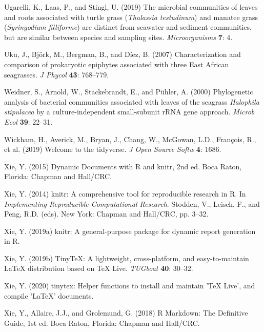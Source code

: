\documentclass[12pt,]{article}
\begin{document}
\leavevmode\hypertarget{ref-Ugarelli2019}{}%
Ugarelli, K., Laas, P., and Stingl, U. (2019) The microbial communities
of leaves and roots associated with turtle grass (\emph{Thalassia
testudinum}) and manatee grass (\emph{Syringodium filliforme}) are
distinct from seawater and sediment communities, but are similar between
species and sampling sites. \emph{Microorganisms} \textbf{7}: 4.

\leavevmode\hypertarget{ref-Uku2007}{}%
Uku, J., Björk, M., Bergman, B., and Díez, B. (2007) Characterization
and comparison of prokaryotic epiphytes associated with three East
African seagrasses. \emph{J Phycol} \textbf{43}: 768--779.

\leavevmode\hypertarget{ref-Weidner2000}{}%
Weidner, S., Arnold, W., Stackebrandt, E., and Pühler, A. (2000)
Phylogenetic analysis of bacterial communities associated with leaves of
the seagrass \emph{Halophila stipulacea} by a culture-independent
small-subunit rRNA gene approach. \emph{Microb Ecol} \textbf{39}:
22--31.

\leavevmode\hypertarget{ref-Wickham2019}{}%
Wickham, H., Averick, M., Bryan, J., Chang, W., McGowan, L.D., François,
R., et al. (2019) Welcome to the tidyverse. \emph{J Open Source Softw}
\textbf{4}: 1686.

\leavevmode\hypertarget{ref-Xie2015}{}%
Xie, Y. (2015) Dynamic Documents with R and knitr, 2nd ed. Boca Raton,
Florida: Chapman and Hall/CRC.

\leavevmode\hypertarget{ref-Xie2014}{}%
Xie, Y. (2014) knitr: A comprehensive tool for reproducible research in
R. In \emph{Implementing Reproducible Computational Research}. Stodden,
V., Leisch, F., and Peng, R.D. (eds). New York: Chapman and Hall/CRC,
pp. 3--32.

\leavevmode\hypertarget{ref-Xie2019}{}%
Xie, Y. (2019a) knitr: A general-purpose package for dynamic report
generation in R.

\leavevmode\hypertarget{ref-Xie2019a}{}%
Xie, Y. (2019b) TinyTeX: A lightweight, cross-platform, and
easy-to-maintain LaTeX distribution based on TeX Live. \emph{TUGboat}
\textbf{40}: 30--32.

\leavevmode\hypertarget{ref-Xie2020}{}%
Xie, Y. (2020) tinytex: Helper functions to install and maintain 'TeX
Live', and compile 'LaTeX' documents.

\leavevmode\hypertarget{ref-Xie2018}{}%
Xie, Y., Allaire, J.J., and Grolemund, G. (2018) R Markdown: The
Definitive Guide, 1st ed. Boca Raton, Florida: Chapman and Hall/CRC.
\end{document}
